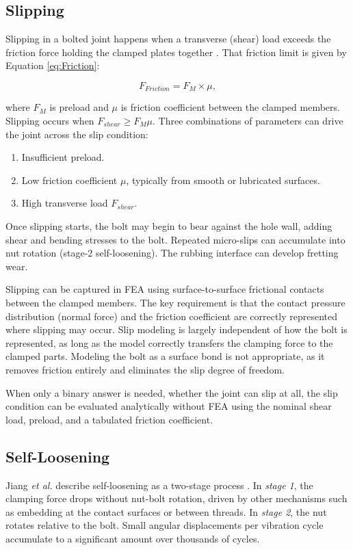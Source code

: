 \documentclass[a4paper,twoside]{bth}
\begin{document}
\subsection{Slipping}
Slipping in a bolted joint happens when a transverse (shear) load exceeds the friction force holding the clamped plates together \cite{49}. That friction limit is given by Equation \ref{eq:Friction}:

\begin{equation} \label{eq:Friction}
    F_{Friction} = F_M\times \mu,
\end{equation}

where $F_M$ is preload and $\mu$ is friction coefficient between the clamped members. Slipping occurs when $F_{shear} \ge F_M\mu$. Three combinations of parameters can drive the joint across the slip condition:
\begin{enumerate}
    \item Insufficient preload.
    \item Low friction coefficient $\mu$, typically from smooth or lubricated surfaces.
    \item High transverse load $F_{shear}$.
\end{enumerate}

Once slipping starts, the bolt may begin to bear against the hole wall, adding shear and bending stresses to the bolt. Repeated micro-slips can accumulate into nut rotation (stage-2 self-loosening). The rubbing interface can develop fretting wear.

Slipping can be captured in \ac{FEA} using surface-to-surface frictional contacts between the clamped members. The key requirement is that the contact pressure distribution (normal force) and the friction coefficient are correctly represented where slipping may occur. Slip modeling is largely independent of how the bolt is represented, as long as the model correctly transfers the clamping force to the clamped parts. Modeling the bolt as a surface bond is not appropriate, as it removes friction entirely and eliminates the slip degree of freedom.

When only a binary answer is needed, whether the joint can slip at all, the slip condition can be evaluated analytically without \ac{FEA} using the nominal shear load, preload, and a tabulated friction coefficient.

\subsection{Self-Loosening}
Jiang \textit{et al.} describe self-loosening as a two-stage process \cite{58}. In \textit{stage 1}, the clamping force drops without nut-bolt rotation, driven by other mechanisms such as embedding at the contact surfaces or between threads. In \textit{stage 2}, the nut rotates relative to the bolt. Small angular displacements per vibration cycle accumulate to a significant amount over thousands of cycles.
\end{document}
